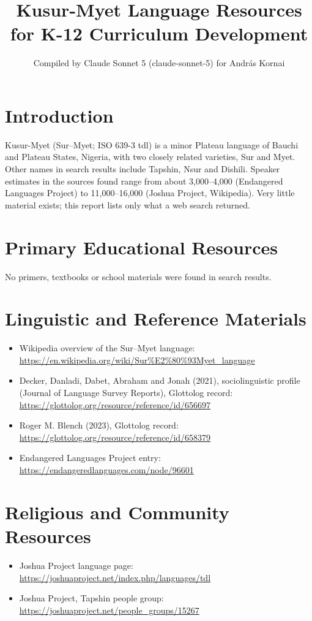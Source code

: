 \documentclass[12pt]{article}
\title{Kusur-Myet Language Resources for K-12 Curriculum Development}
\author{Compiled by Claude Sonnet 5 (claude-sonnet-5) for Andr\'as Kornai}
\date{}
\begin{document}
\maketitle
\section{Introduction}
Kusur-Myet (Sur--Myet; ISO 639-3 tdl) is a minor Plateau language of Bauchi and Plateau States, Nigeria, with two closely related varieties, Sur and Myet. Other names in search results include Tapshin, Nsur and Dishili. Speaker estimates in the sources found range from about 3,000--4,000 (Endangered Languages Project) to 11,000--16,000 (Joshua Project, Wikipedia). Very little material exists; this report lists only what a web search returned.
\section{Primary Educational Resources}
No primers, textbooks or school materials were found in search results.
\section{Linguistic and Reference Materials}
\begin{itemize}
\item Wikipedia overview of the Sur--Myet language: \url{https://en.wikipedia.org/wiki/Sur%E2%80%93Myet_language}
\item Decker, Danladi, Dabet, Abraham and Jonah (2021), sociolinguistic profile (Journal of Language Survey Reports), Glottolog record: \url{https://glottolog.org/resource/reference/id/656697}
\item Roger M. Blench (2023), Glottolog record: \url{https://glottolog.org/resource/reference/id/658379}
\item Endangered Languages Project entry: \url{https://endangeredlanguages.com/node/96601}
\end{itemize}
\section{Religious and Community Resources}
\begin{itemize}
\item Joshua Project language page: \url{https://joshuaproject.net/index.php/languages/tdl}
\item Joshua Project, Tapshin people group: \url{https://joshuaproject.net/people_groups/15267}
\end{itemize}
\end{document}
